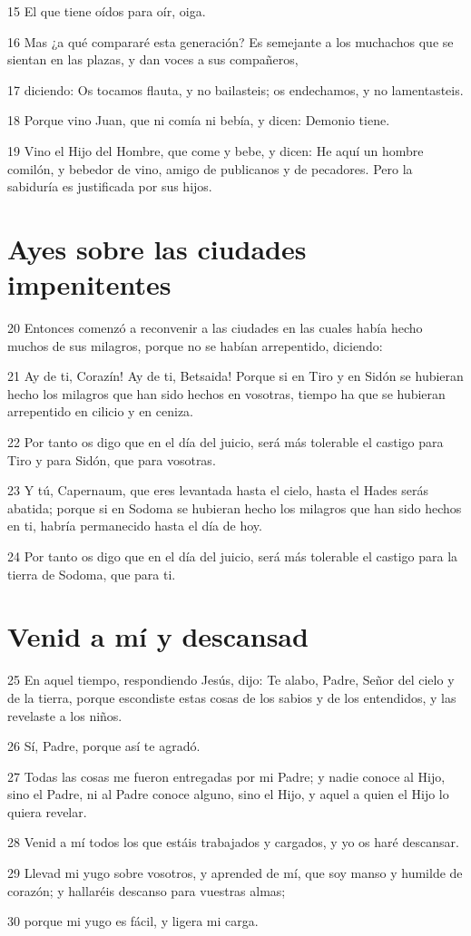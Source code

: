 \par 15 El que tiene oídos para oír, oiga.
\par 16 Mas ¿a qué compararé esta generación? Es semejante a los muchachos que se sientan en las plazas, y dan voces a sus compañeros,
\par 17 diciendo: Os tocamos flauta, y no bailasteis; os endechamos, y no lamentasteis.
\par 18 Porque vino Juan, que ni comía ni bebía, y dicen: Demonio tiene.
\par 19 Vino el Hijo del Hombre, que come y bebe, y dicen: He aquí un hombre comilón, y bebedor de vino, amigo de publicanos y de pecadores. Pero la sabiduría es justificada por sus hijos.

\section*{Ayes sobre las ciudades impenitentes}

\par 20 Entonces comenzó a reconvenir a las ciudades en las cuales había hecho muchos de sus milagros, porque no se habían arrepentido, diciendo:
\par 21 Ay de ti, Corazín! Ay de ti, Betsaida! Porque si en Tiro y en Sidón se hubieran hecho los milagros que han sido hechos en vosotras, tiempo ha que se hubieran arrepentido en cilicio y en ceniza.
\par 22 Por tanto os digo que en el día del juicio, será más tolerable el castigo para Tiro y para Sidón, que para vosotras.
\par 23 Y tú, Capernaum, que eres levantada hasta el cielo, hasta el Hades serás abatida; porque si en Sodoma se hubieran hecho los milagros que han sido hechos en ti, habría permanecido hasta el día de hoy.
\par 24 Por tanto os digo que en el día del juicio, será más tolerable el castigo para la tierra de Sodoma, que para ti.

\section*{Venid a mí y descansad}

\par 25 En aquel tiempo, respondiendo Jesús, dijo: Te alabo, Padre, Señor del cielo y de la tierra, porque escondiste estas cosas de los sabios y de los entendidos, y las revelaste a los niños.
\par 26 Sí, Padre, porque así te agradó.
\par 27 Todas las cosas me fueron entregadas por mi Padre; y nadie conoce al Hijo, sino el Padre, ni al Padre conoce alguno, sino el Hijo, y aquel a quien el Hijo lo quiera revelar.
\par 28 Venid a mí todos los que estáis trabajados y cargados, y yo os haré descansar.
\par 29 Llevad mi yugo sobre vosotros, y aprended de mí, que soy manso y humilde de corazón; y hallaréis descanso para vuestras almas;
\par 30 porque mi yugo es fácil, y ligera mi carga.

